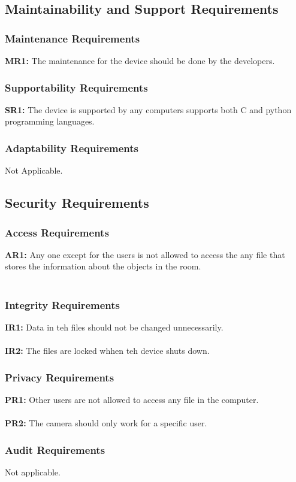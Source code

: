 \documentclass[12pt]{article}
\begin{document}
\subsection{Maintainability and Support Requirements}
\subsubsection{Maintenance Requirements}
\textbf{MR1:} The maintenance for the device should be done by the developers.
\subsubsection{Supportability Requirements}
\textbf{SR1:} The device is supported by any computers supports both C and python programming languages.
\subsubsection{Adaptability Requirements}
Not Applicable.
\subsection{Security Requirements}
\subsubsection{Access Requirements}
\textbf{AR1:} Any one except for the users is not allowed to access the any file that stores the information about the objects in the room.\\\\


\subsubsection{Integrity Requirements}
\textbf{IR1:} Data in teh files should not be changed unnecessarily.\\\\
\textbf{IR2:} The files are locked whhen teh device shuts down.
\subsubsection{Privacy Requirements}

\textbf{PR1:} Other users are not allowed to access any file in the computer.\\\\

\textbf{PR2:} The camera should only work for a specific user.
\subsubsection{Audit Requirements}
Not applicable.
\end{document}
